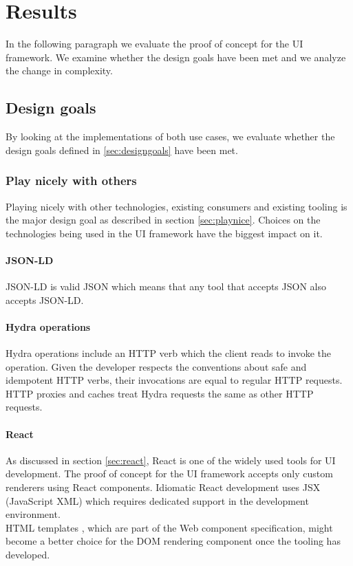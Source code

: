 \section{Results}
In the following paragraph we evaluate the proof of concept for the UI framework. We examine whether the design goals have been met and we analyze the change in complexity.

\subsection{Design goals}
By looking at the implementations of both use cases, we evaluate whether the design goals defined in \ref{sec:designgoals} have been met.

\subsubsection{Play nicely with others}
Playing nicely with other technologies, existing consumers and existing tooling is the major design goal as described in section \ref{sec:playnice}. Choices on the technologies being used in the UI framework have the biggest impact on it.

\paragraph{JSON-LD}
JSON-LD is valid JSON which means that any tool that accepts JSON also accepts JSON-LD.

\paragraph{Hydra operations}
Hydra operations include an  HTTP verb which the client reads to invoke the operation. Given the developer respects the conventions about safe and idempotent HTTP verbs, their invocations are equal to regular HTTP requests. HTTP proxies and caches treat Hydra requests the same as other HTTP requests.

\paragraph{React}
As discussed in section \ref{sec:react}, React is one of the widely used tools for UI development. The proof of concept for the UI framework accepts only custom renderers using React components. Idiomatic React development uses JSX (JavaScript XML) which requires dedicated support in the development environment. \\
HTML templates \citep{htmltemplates}, which are part of the Web component specification, might become a better choice for the DOM rendering component once the tooling has developed.


